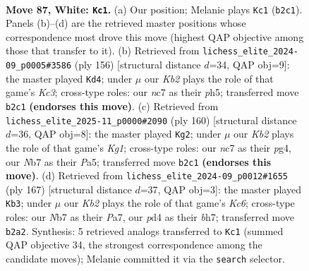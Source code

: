 \documentclass[11pt]{article}
\begin{document}
\clearpage

\begin{figure}[p]\centering
\begin{subfigure}{0.46\textwidth}\centering
\resizebox{\linewidth}{!}{%
\newchessgame
\chessboard[
  setfen={8/1Nn3k1/8/p7/Pb1pP2n/1P1B3p/1K2P3/8 w - - 40 87},
  showmover=false,
  pgfstyle=straightmove, color=movearrow, markmove={b2-c1}
]}
\caption{}
\end{subfigure}\hfill
\begin{subfigure}{0.46\textwidth}\centering
\resizebox{\linewidth}{!}{%
\newchessgame
\chessboard[
  setfen={8/8/p3pBk1/Pb2P2p/1P5P/2K5/8/8 w - - 38 79},
  showmover=false,
  pgfstyle=straightmove, color=movearrow, markmove={c3-d4}
]}
\caption{}
\end{subfigure}
\\[4pt]
\begin{subfigure}{0.46\textwidth}\centering
\resizebox{\linewidth}{!}{%
\newchessgame
\chessboard[
  setfen={8/8/8/P6p/3Bp1p1/3bP1P1/5P2/3k2K1 w - - 40 81},
  showmover=false,
  pgfstyle=straightmove, color=movearrow, markmove={g1-g2}
]}
\caption{}
\end{subfigure}\hfill
\begin{subfigure}{0.46\textwidth}\centering
\resizebox{\linewidth}{!}{%
\newchessgame
\chessboard[
  setfen={8/p1p4B/1p5p/1P5P/P4p2/2k1bP2/8/1K6 b - - 82 84},
  showmover=false,
  pgfstyle=straightmove, color=movearrow, markmove={c3-b3}
]}
\caption{}
\end{subfigure}
\caption{\textbf{Move 87, White: \texttt{Kc1}.} (a) Our position; Melanie plays \texttt{Kc1} (\texttt{b2c1}). Panels (b)--(d) are the retrieved master positions whose correspondence most drove this move (highest QAP objective among those that transfer to it). (b) Retrieved from \texttt{lichess\_elite\_2024-09\_p0005\#3586} (ply 156) [structural distance $d$=34, QAP obj=9]: the master played \texttt{Kd4}; under $\mu$ our \emph{Kb2} plays the role of that game's \emph{Kc3}; cross-type roles: our \emph{n}c7 as their \emph{p}h5; transferred move \texttt{b2c1} \textbf{(endorses this move)}. (c) Retrieved from \texttt{lichess\_elite\_2025-11\_p0000\#2090} (ply 160) [structural distance $d$=36, QAP obj=8]: the master played \texttt{Kg2}; under $\mu$ our \emph{Kb2} plays the role of that game's \emph{Kg1}; cross-type roles: our \emph{n}c7 as their \emph{p}g4, our \emph{N}b7 as their \emph{P}a5; transferred move \texttt{b2c1} \textbf{(endorses this move)}. (d) Retrieved from \texttt{lichess\_elite\_2024-09\_p0012\#1655} (ply 167) [structural distance $d$=37, QAP obj=3]: the master played \texttt{Kb3}; under $\mu$ our \emph{Kb2} plays the role of that game's \emph{Kc6}; cross-type roles: our \emph{N}b7 as their \emph{P}a7, our \emph{p}d4 as their \emph{b}h7; transferred move \texttt{b2a2}. Synthesis: 5 retrieved analogs transferred to \texttt{Kc1} (summed QAP objective 34, the strongest correspondence among the candidate moves); Melanie committed it via the \texttt{search} selector.}
\label{fig:thought-m172}
\end{figure}
\end{document}
